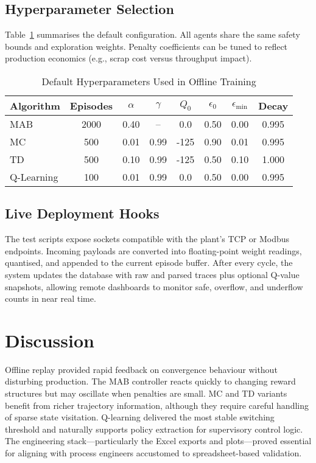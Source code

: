 \documentclass[journal]{IEEEtranTIE}
\begin{document}
\subsection{Hyperparameter Selection}
Table~\ref{tab:hyperparams} summarises the default configuration. All agents share the same safety bounds and exploration weights. Penalty coefficients can be tuned to reflect production economics (e.g., scrap cost versus throughput impact).

\begin{table}[t]
  \caption{Default Hyperparameters Used in Offline Training}
  \label{tab:hyperparams}
  \centering
  \begin{tabular}{lccccccc}
    \toprule
    Algorithm & Episodes & $\alpha$ & $\gamma$ & $Q_0$ & $\epsilon_0$ & $\epsilon_{\min}$ & Decay \\
    \midrule
    MAB & 2000 & 0.40 & -- & 0.0 & 0.50 & 0.00 & 0.995 \\
    MC & 500 & 0.01 & 0.99 & -125 & 0.90 & 0.01 & 0.995 \\
    TD & 500 & 0.10 & 0.99 & -125 & 0.50 & 0.10 & 1.000 \\
    Q-Learning & 100 & 0.01 & 0.99 & 0.0 & 0.50 & 0.00 & 0.995 \\
    \bottomrule
  \end{tabular}
\end{table}

\subsection{Live Deployment Hooks}
The test scripts expose sockets compatible with the plant's TCP or Modbus endpoints. Incoming payloads are converted into floating-point weight readings, quantised, and appended to the current episode buffer. After every cycle, the system updates the database with raw and parsed traces plus optional Q-value snapshots, allowing remote dashboards to monitor safe, overflow, and underflow counts in near real time.

\section{Discussion}
Offline replay provided rapid feedback on convergence behaviour without disturbing production. The MAB controller reacts quickly to changing reward structures but may oscillate when penalties are small. MC and TD variants benefit from richer trajectory information, although they require careful handling of sparse state visitation. Q-learning delivered the most stable switching threshold and naturally supports policy extraction for supervisory control logic. The engineering stack---particularly the Excel exports and plots---proved essential for aligning with process engineers accustomed to spreadsheet-based validation.
\end{document}
